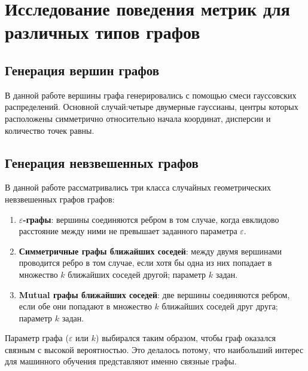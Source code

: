 \chapter{Исследование поведения метрик для различных типов графов} \label{chapt2}

\section{Генерация вершин графов} \label{sect2_1}

В данной работе вершины графа генерировались с помощью смеси гауссовских распределений. Основной случай:четыре двумерные гауссианы, центры которых расположены симметрично относительно начала координат, дисперсии и количество точек равны.




\section{Генерация невзвешенных графов} \label{sect2_2}

В данной работе рассматривались три класса случайных геометрических невзвешенных графов графов: 
\begin{enumerate}
  \item \textbf{$\varepsilon$-графы}: вершины соединяются ребром в том случае, когда евклидово расстояние между ними не превышает заданного параметра $\varepsilon$.
  \item \textbf{Симметричные графы ближайших соседей}: между двумя вершинами проводится ребро в том случае, если хотя бы одна из них попадает в множество $k$ ближайших соседей другой; параметр $k$ задан.
  \item \textbf{Mutual графы ближайших соседей}: две вершины соединяются ребром, если обе они попадают в множество $k$ ближайших соседей друг друга; параметр $k$ задан.
\end{enumerate}

Параметр графа ($\varepsilon$ или $k$) выбирался таким образом, чтобы граф оказался связным с высокой вероятностью. Это делалось потому, что наибольший интерес для машинного обучения представляют именно связные графы.

